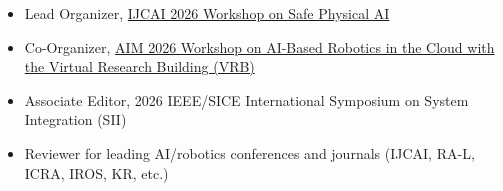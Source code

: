 
\begin{itemize}
    \item Lead Organizer, \href{https://safephysicalai.github.io}{IJCAI 2026 Workshop on Safe Physical AI}
    \item Co-Organizer, \href{https://ai.uni-bremen.de/blog/ai-based_robotics_in_the_cloud_with_the_virtual_research_building_vrb_-_hands-on_workshop_at_aim_2026}{AIM 2026 Workshop on AI-Based Robotics in the Cloud with the Virtual Research Building (VRB)}
    \item Associate Editor, 2026 IEEE/SICE International Symposium on System Integration (SII)
    \item Reviewer for leading AI/robotics conferences and journals (IJCAI, RA-L, ICRA, IROS, KR, etc.)
\end{itemize}

